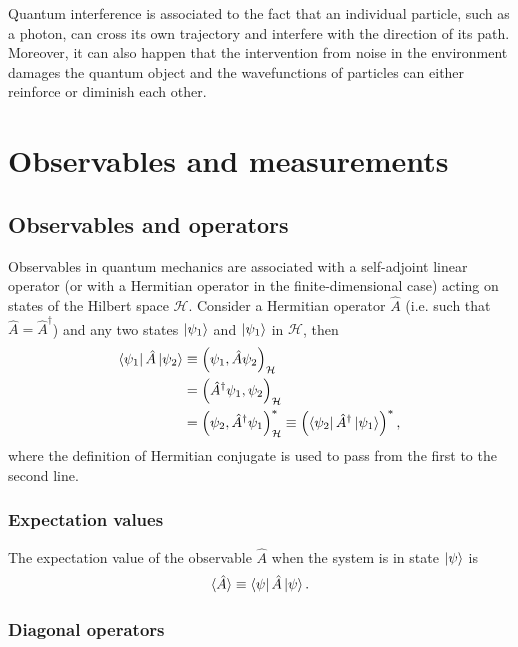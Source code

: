 Quantum interference is associated to the fact that an individual particle, such as a photon, can cross its own trajectory and interfere with the direction of its path. Moreover, it can also happen that the intervention from noise in the environment damages the quantum object and the wavefunctions of particles can either reinforce or diminish each other.



\section{Observables and measurements}

\subsection{Observables and operators}

Observables in quantum mechanics are associated with a self-adjoint linear operator (or with a Hermitian operator in the finite-dimensional case) acting on states of the Hilbert space $\mathcal{H}$. Consider a Hermitian operator $\hat{A}$ (i.e. such that $\hat{A} = \hat{A}^\dagger$) and any two states $\ket{\psi_1}$ and $\ket{\psi_1}$ in $\mathcal{H}$, then 
\begin{align*}
    \bra{\psi_1} \hat{A} \ket{\psi_2} &\equiv \left(\psi_1, \hat{A} \psi_2 \right)_\mathcal{H} \\
    &= \left(\hat{A}^{\dagger} \psi_1, \psi_2 \right)_\mathcal{H} \\ 
    &= \left(\psi_2, \hat{A}^{\dagger} \psi_1 \right)^*_\mathcal{H} \equiv  \left(\bra{\psi_2} \hat{A}^{\dagger} \ket{\psi_1} \right)^*,
\end{align*}
where the definition of Hermitian conjugate is used to pass from the first to the second line. 

\subsubsection{Expectation values}

The expectation value of the observable $\hat{A}$ when the system is in state $\ket{\psi}$ is
\begin{align*}
    \langle \hat{A} \rangle \equiv \bra{\psi} \hat{A} \ket{\psi}. 
\end{align*}


\subsubsection{Diagonal operators}


